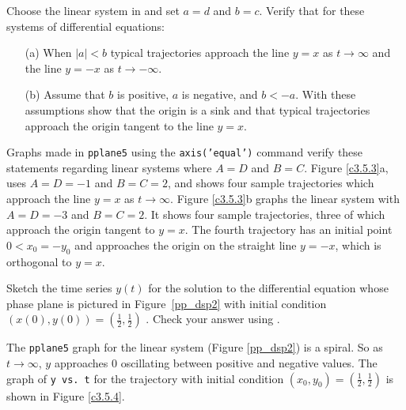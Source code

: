 \documentclass{ximera}
\begin{document}
\begin{exercise} \label{c3.5.3}
Choose the {\sf linear system} in {\pplane} and set
$a=d$ and $b=c$.  Verify that for these systems of differential
equations:
\begin{itemize}
\item[(a)]  When $|a|<b$ typical trajectories approach the line
$y=x$ as $t\to\infty$ and the line $y=-x$ as $t\to -\infty$.
\item[(b)]  Assume that $b$ is positive, $a$ is negative, and $b<-a$. 
With these assumptions show that the origin is a sink and that typical 
trajectories approach the origin tangent to the line $y=x$.
\end{itemize}

\begin{solution}

Graphs made in {\tt pplane5} using the {\tt axis('equal')} command
verify these statements regarding linear systems where $A = D$
and $B = C$.  Figure \ref{c3.5.3}a, uses $A = D = -1$ and
$B = C = 2$, and shows four sample trajectories which approach
the line $y = x$ as $t \rightarrow \infty$.  Figure
\ref{c3.5.3}b graphs the linear system with $A = D = -3$
and $B = C = 2$.  It shows four sample trajectories, three of
which approach the origin tangent to $y = x$.  The fourth
trajectory has an initial point $0 < x_0 = -y_0$ and approaches
the origin on the straight line $y = -x$, which is orthogonal
to $y = x$.
\begin{figure}[htb]
                       \centerline{%
                       }
\end{figure}

\end{solution}
\end{exercise}

\TEXER

\begin{exercise} \label{c3.5.4}
Sketch the time series $y(t)$ for the solution to the
differential equation whose phase plane is pictured in
Figure~\ref{pp_dsp2} with initial condition
$(x(0),y(0))=\left(\frac{1}{2},\frac{1}{2}\right)$ .  Check your answer
using {\pplane}.

\begin{solution}

The {\tt pplane5} graph for the linear system (Figure \ref{pp_dsp2}) is
a spiral.  So as $t \rightarrow \infty$, $y$ approaches $0$ oscillating
between positive and negative values.  The graph of {\tt y vs.\ t} for the
trajectory with initial condition $(x_0,y_0) = \left(\frac{1}{2},
\frac{1}{2}\right)$ is shown in Figure \ref{c3.5.4}.

\begin{figure}[htb]
                       \centerline{%
                       }
\end{figure}

\end{solution}
\end{exercise}
\end{document}
